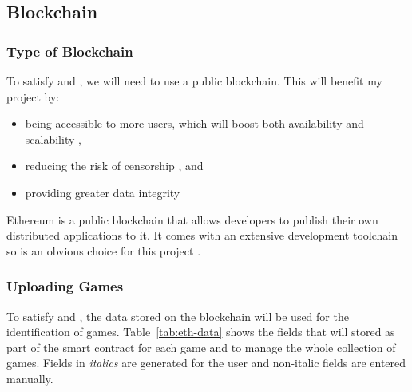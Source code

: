 
\subsection*{Blockchain}\label{subsec:design-con-eth}

\subsubsection*{Type of Blockchain}

To satisfy  and , we will need to use a public blockchain. This will benefit my project by:
\vspace{2mm}
\begin{itemize}
  \item being accessible to more users, which will boost both availability and scalability ,
  \item reducing the risk of censorship , and
  \item providing greater data integrity 
\end{itemize}

\newparagraph Ethereum is a public blockchain that allows developers to publish their own distributed applications to it. It comes with an extensive development toolchain so is an obvious choice for this project .

\subsubsection*{Uploading Games}
\label{subsubsec:eth-data}



To satisfy  and , the data stored on the blockchain will be used for the identification of games. Table~\ref{tab:eth-data} shows the fields that will stored as part of the smart contract for each game and to manage the whole collection of games. Fields in \textit{italics} are generated for the user and non-italic fields are entered manually.

